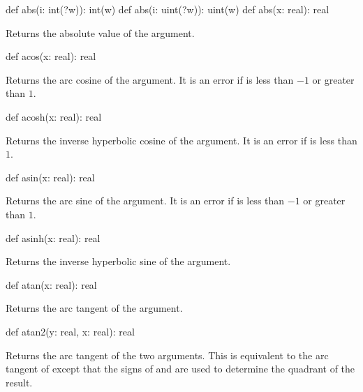 \begin{protohead}
def abs(i: int(?w)): int(w)
def abs(i: uint(?w)): uint(w)
def abs(x: real): real
\end{protohead}
\begin{protobody}
Returns the absolute value of the argument.
\end{protobody}

\begin{protohead}
def acos(x: real): real
\end{protohead}
\begin{protobody}
Returns the arc cosine of the argument.  It is an error if  is
less than $-1$ or greater than $1$.
\end{protobody}

\begin{protohead}
def acosh(x: real): real
\end{protohead}
\begin{protobody}
Returns the inverse hyperbolic cosine of the argument.  It is an error
if  is less than $1$.
\end{protobody}

\begin{protohead}
def asin(x: real): real
\end{protohead}
\begin{protobody}
Returns the arc sine of the argument.  It is an error if  is
less than $-1$ or greater than $1$.
\end{protobody}

\begin{protohead}
def asinh(x: real): real
\end{protohead}
\begin{protobody}
Returns the inverse hyperbolic sine of the argument.
\end{protobody}

\begin{protohead}
def atan(x: real): real
\end{protohead}
\begin{protobody}
Returns the arc tangent of the argument.
\end{protobody}

\begin{protohead}
def atan2(y: real, x: real): real
\end{protohead}
\begin{protobody}
Returns the arc tangent of the two arguments.  This is equivalent to
the arc tangent of  except that the signs of 
and  are used to determine the quadrant of the result.
\end{protobody}

